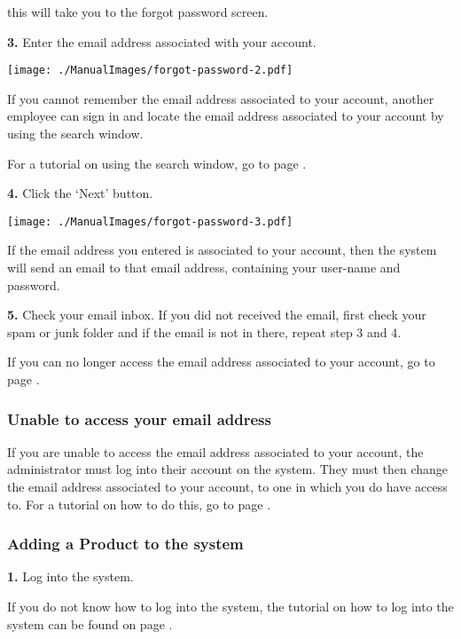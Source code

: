 this will take you to the forgot password screen.

\textbf{3.} Enter the email address associated with your account.

\texttt{[image: ./ManualImages/forgot-password-2.pdf]}

If you cannot remember the email address associated to your account, another employee can sign in and locate the email address associated to your account by using the search window.

For a tutorial on using the search window, go to page .

\textbf{4.} Click the `Next' button.

\texttt{[image: ./ManualImages/forgot-password-3.pdf]}

If the email address you entered is associated to your account, then the system will send an email to that email address, containing your user-name and password.

\textbf{5.} Check your email inbox. If you did not received the email, first check your spam or junk folder and if the email is not in there, repeat step 3 and 4.

If you can no longer access the email address associated to your account, go to page \pageref{fig:Unable to access your email address}.

\pagebreak
\subsubsection{Unable to access your email address}
\label{fig:Unable to access your email address}

If you are unable to access the email address associated to your account, the administrator must log into their account on the system. They must then change the email address associated to your account, to one in which you do have access to. For a tutorial on how to do this, go to page \pageref{fig:Editing an Employee in the system}.

\pagebreak
\subsubsection{Adding a Product to the system}
\label{fig:Adding a Product to the system}

\textbf{1.} Log into the system.

If you do not know how to log into the system, the tutorial on how to log into the system can be found on page \pageref{fig:Logging into the system}.

